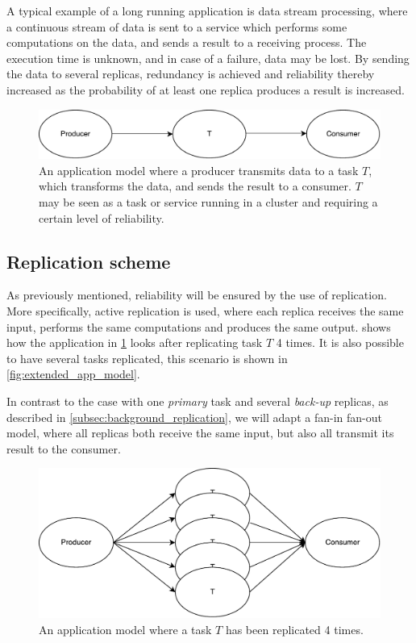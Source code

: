 \documentclass{cslthse-msc}
\begin{document}
A typical example of a long running application is data stream processing, where a continuous stream of data is sent to a service which performs some computations on the data, and sends a result to a receiving process. The execution time is unknown, and in case of a failure, data may be lost. By sending the data to several replicas, redundancy is achieved and reliability thereby increased as the probability of at least one replica produces a result is increased.

\begin{figure}[!hbt]
\centering
\includegraphics[scale=0.5]{images/app_model.pdf} 
\caption[Application model]{An application model where a producer transmits data to a task $T$, which transforms the data, and sends the result to a consumer. $T$ may be seen as a task or service running in a cluster and requiring a certain level of reliability.}\label{fig:app_model}
\end{figure}

\subsection{Replication scheme} \label{subsec:design_repl_scheme}
As previously mentioned, reliability will be ensured by the use of replication. More specifically, active replication is used, where each replica receives the same input, performs the same computations and produces the same output.  shows how the application in \cref{fig:app_model} looks after replicating task $T$ 4 times. It is also possible to have several tasks replicated, this scenario is shown in \cref{fig:extended_app_model}.

In contrast to the case with one \emph{primary} task and several \emph{back-up} replicas, as described in \cref{subsec:background_replication}, we will adapt a fan-in fan-out model, where all replicas both receive the same input, but also all transmit its result to the consumer. %

\begin{figure}[!hbt]
\centering
\includegraphics[scale=0.5]{images/app_model_replication.pdf} 
\caption[Application model with replicas]{An application model where a task $T$ has been replicated 4 times.}\label{fig:app_model_replication}
\end{figure}
\end{document}
